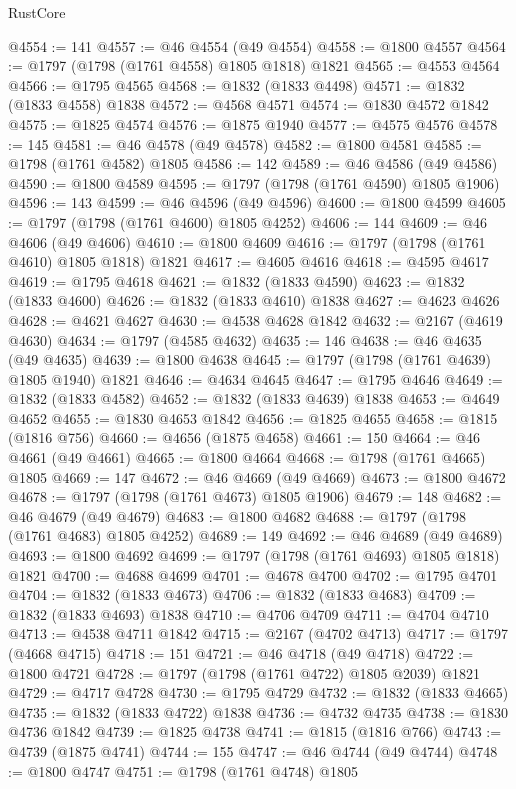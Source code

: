 \begin{lexlean}{RustCore}
\begin{coremodule}
@4554 := 141
@4557 := @46 @4554 (@49 @4554)
@4558 := @1800 @4557
@4564 := @1797 (@1798 (@1761 @4558) @1805 @1818) @1821
@4565 := @4553 @4564
@4566 := @1795 @4565
@4568 := @1832 (@1833 @4498)
@4571 := @1832 (@1833 @4558) @1838
@4572 := @4568 @4571
@4574 := @1830 @4572 @1842
@4575 := @1825 @4574
@4576 := @1875 @1940
@4577 := @4575 @4576
@4578 := 145
@4581 := @46 @4578 (@49 @4578)
@4582 := @1800 @4581
@4585 := @1798 (@1761 @4582) @1805
@4586 := 142
@4589 := @46 @4586 (@49 @4586)
@4590 := @1800 @4589
@4595 := @1797 (@1798 (@1761 @4590) @1805 @1906)
@4596 := 143
@4599 := @46 @4596 (@49 @4596)
@4600 := @1800 @4599
@4605 := @1797 (@1798 (@1761 @4600) @1805 @4252)
@4606 := 144
@4609 := @46 @4606 (@49 @4606)
@4610 := @1800 @4609
@4616 := @1797 (@1798 (@1761 @4610) @1805 @1818) @1821
@4617 := @4605 @4616
@4618 := @4595 @4617
@4619 := @1795 @4618
@4621 := @1832 (@1833 @4590)
@4623 := @1832 (@1833 @4600)
@4626 := @1832 (@1833 @4610) @1838
@4627 := @4623 @4626
@4628 := @4621 @4627
@4630 := @4538 @4628 @1842
@4632 := @2167 (@4619 @4630)
@4634 := @1797 (@4585 @4632)
@4635 := 146
@4638 := @46 @4635 (@49 @4635)
@4639 := @1800 @4638
@4645 := @1797 (@1798 (@1761 @4639) @1805 @1940) @1821
@4646 := @4634 @4645
@4647 := @1795 @4646
@4649 := @1832 (@1833 @4582)
@4652 := @1832 (@1833 @4639) @1838
@4653 := @4649 @4652
@4655 := @1830 @4653 @1842
@4656 := @1825 @4655
@4658 := @1815 (@1816 @756)
@4660 := @4656 (@1875 @4658)
@4661 := 150
@4664 := @46 @4661 (@49 @4661)
@4665 := @1800 @4664
@4668 := @1798 (@1761 @4665) @1805
@4669 := 147
@4672 := @46 @4669 (@49 @4669)
@4673 := @1800 @4672
@4678 := @1797 (@1798 (@1761 @4673) @1805 @1906)
@4679 := 148
@4682 := @46 @4679 (@49 @4679)
@4683 := @1800 @4682
@4688 := @1797 (@1798 (@1761 @4683) @1805 @4252)
@4689 := 149
@4692 := @46 @4689 (@49 @4689)
@4693 := @1800 @4692
@4699 := @1797 (@1798 (@1761 @4693) @1805 @1818) @1821
@4700 := @4688 @4699
@4701 := @4678 @4700
@4702 := @1795 @4701
@4704 := @1832 (@1833 @4673)
@4706 := @1832 (@1833 @4683)
@4709 := @1832 (@1833 @4693) @1838
@4710 := @4706 @4709
@4711 := @4704 @4710
@4713 := @4538 @4711 @1842
@4715 := @2167 (@4702 @4713)
@4717 := @1797 (@4668 @4715)
@4718 := 151
@4721 := @46 @4718 (@49 @4718)
@4722 := @1800 @4721
@4728 := @1797 (@1798 (@1761 @4722) @1805 @2039) @1821
@4729 := @4717 @4728
@4730 := @1795 @4729
@4732 := @1832 (@1833 @4665)
@4735 := @1832 (@1833 @4722) @1838
@4736 := @4732 @4735
@4738 := @1830 @4736 @1842
@4739 := @1825 @4738
@4741 := @1815 (@1816 @766)
@4743 := @4739 (@1875 @4741)
@4744 := 155
@4747 := @46 @4744 (@49 @4744)
@4748 := @1800 @4747
@4751 := @1798 (@1761 @4748) @1805

\end{coremodule}
\end{lexlean}
